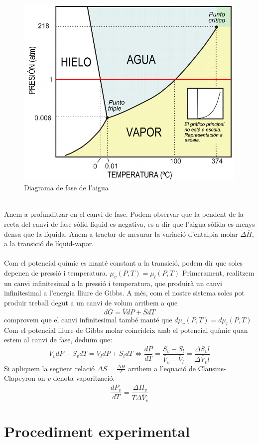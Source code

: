 \documentclass{article}
\begin{document}
    \begin{figure}[h]
        \centering
        \includegraphics[width=.5\textwidth]{fotos/fase.png}
        \caption{Diagrama de fase de l'aigua}
        \label{fig:DiagramaFase}
    \end{figure}
    \hfill{}\\ 
    Anem a profunditzar en el canvi de fase. Podem observar que la pendent de la recta del canvi de fase sòlid-líquid es negativa, es a dir que l'aigua sòlida es menys densa que la líquida. Anem a tractar de mesurar la variació d'entalpia molar $\Delta\overline{H}$, a la transició de líquid-vapor. \\ \\Com el potencial químic es manté constant a la transició, podem dir que soles depenen de pressió i temperatura. $\mu_v\left(P,T\right)=\mu_l\left(P,T\right)$ Primerament, realitzem un canvi infinitesimal a la pressió i temperatura, que produirà un canvi infinitesimal a l'energia lliure de Gibbs. A més, com el nostre sistema soles pot produir treball degut a un canvi de volum arribem a que \[d\overline{G}=\overline{V}dP + \overline{S}dT\] comprovem que el canvi infinitesimal també manté que $d\mu_v\left(P,T\right)=d\mu_l\left(P,T\right)$ Com el potencial lliure de Gibbs molar coincideix amb el potencial químic quan estem al canvi de fase, deduïm que: \[\overline{V}_vdP + \overline{S}_vdT = \overline{V}_ldP + \overline{S}_idT \iff \frac{dP}{dT}=\frac{\overline{S}_v-\overline{S}_l}{\overline{V}_v-\overline{V}_l}=\frac{\Delta\overline{S}_vl}{\Delta\overline{V}_vl}\] Si apliquem la següent relació $\Delta\overline{S}=\frac{\Delta\overline{H}}{T}$ arribem a l'equació de Clausius-Clapeyron on $v$ denota vaporització. \[\frac{dP_v}{dT}=\frac{\Delta\overline{H}_v}{T\Delta\overline{V}_v}\]
\clearpage
\section{Procediment experimental}
\end{document}
